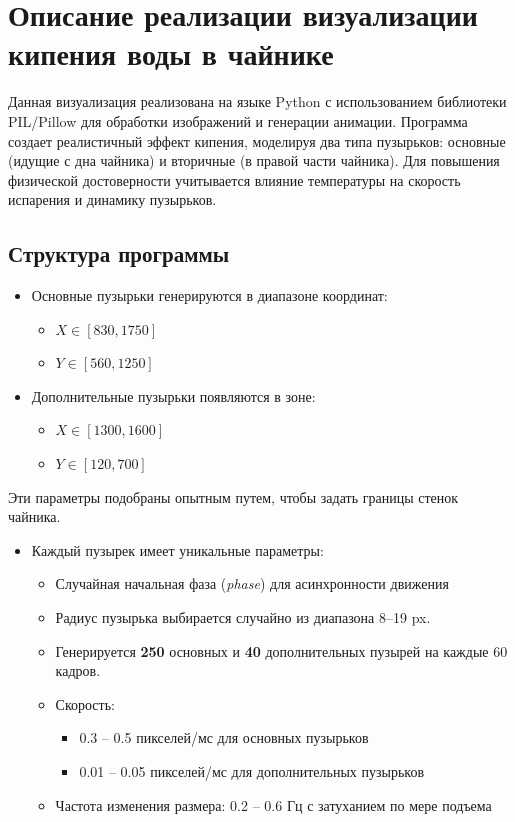 \documentclass[areasetadvanced]{scrartcl}
\begin{document}
\newpage
\section{Описание реализации визуализации кипения воды в чайнике}
Данная визуализация реализована на языке Python с использованием библиотеки PIL/Pillow для обработки изображений и генерации анимации. Программа создает реалистичный эффект кипения, моделируя два типа пузырьков: основные (идущие с дна чайника) и вторичные (в правой части чайника). Для повышения физической достоверности учитывается влияние температуры на скорость испарения и динамику пузырьков.
\subsection{Структура программы}
\begin{itemize}
    \item Основные пузырьки генерируются в диапазоне координат:
    \begin{itemize}
        \item $X \in [830, 1750]$
        \item $Y \in [560, 1250]$
    \end{itemize}
    \item Дополнительные пузырьки появляются в зоне:
    \begin{itemize}
        \item $X \in [1300, 1600]$
        \item $Y \in [120, 700]$
    \end{itemize}
\end{itemize}

Эти параметры подобраны опытным путем, чтобы задать границы стенок чайника.

\begin{itemize}
    \item Каждый пузырек имеет уникальные параметры:
    \begin{itemize}
        \item Случайная начальная фаза (\textit{phase}) для асинхронности движения
        \item Радиус пузырька выбирается случайно из диапазона 8–19 px.
        \item Генерируется \textbf{250} основных и \textbf{40} дополнительных пузырей на каждые 60 кадров.
        \item Скорость:
        \begin{itemize}
            \item 0.3 -- 0.5 пикселей/мс для основных пузырьков
            \item 0.01 -- 0.05 пикселей/мс для дополнительных пузырьков
        \end{itemize}
        \item Частота изменения размера: 0.2 -- 0.6 Гц с затуханием по мере подъема
    \end{itemize}
\end{itemize}
\end{document}
